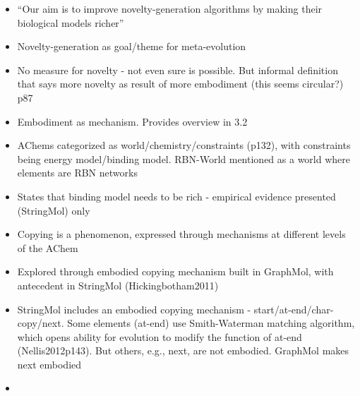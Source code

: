 		
\autocite{Nellis2012}
		\begin{itemize}
			
			\item
			
			``Our aim is to improve novelty-generation algorithms by making their
			biological models richer''
			
			\item
			
			Novelty-generation as goal/theme for meta-evolution
			
			\item
			
			No measure for novelty - not even sure is possible. But informal
			definition that says more novelty as result of more embodiment (this
			seems circular?) p87
			
			\item
			
			Embodiment as mechanism. Provides overview in 3.2
			
			\item
			
			AChems categorized as world/chemistry/constraints (p132), with
			constraints being energy model/binding model. RBN-World mentioned as a
			world where elements are RBN networks
			
			\item
			
			States that binding model needs to be rich - empirical evidence
			presented (StringMol) only
			
			\item
			
			Copying is a phenomenon, expressed through mechanisms at different
			levels of the AChem
			
			\item
			
			Explored through embodied copying mechanism built in GraphMol, with
			antecedent in StringMol (Hickingbotham2011)
			
			\item
			
			StringMol includes an embodied copying mechanism -
			start/at-end/char-copy/next. Some elements (at-end) use Smith-Waterman
			matching algorithm, which opens ability for evolution to modify the
			function of at-end (Nellis2012p143). But others, e.g., next, are not
			embodied. GraphMol makes next embodied
			
			\item
			

\end{itemize}
